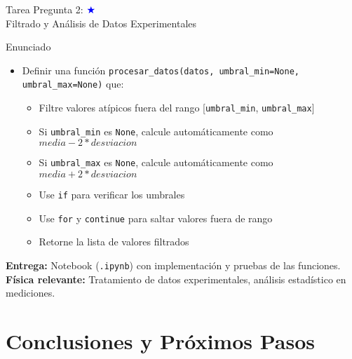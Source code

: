\documentclass[10pt]{beamer}
\begin{document}
\begin{frame}{Tarea Pregunta 2: \hfill \textcolor{blue}{$\bigstar$} \\ Filtrado y Análisis de Datos Experimentales}
  \begin{block}{Enunciado}
    \begin{itemize}
      \item Definir una función \texttt{procesar\_datos(datos, umbral\_min=None, umbral\_max=None)} que:
        \begin{itemize}
          \item Filtre valores atípicos fuera del rango [\texttt{umbral\_min}, \texttt{umbral\_max}]
          \item Si \texttt{umbral\_min} es \texttt{None}, calcule automáticamente como $media - 2*desviacion$
          \item Si \texttt{umbral\_max} es \texttt{None}, calcule automáticamente como $media + 2*desviacion$
          \item Use \texttt{if} para verificar los umbrales
          \item Use \texttt{for} y \texttt{continue} para saltar valores fuera de rango
          \item Retorne la lista de valores filtrados
        \end{itemize}
    \end{itemize}
  \end{block}
  
  \textbf{Entrega:} Notebook (\texttt{.ipynb}) con implementación y pruebas de las funciones.\\
  \textbf{Física relevante:} Tratamiento de datos experimentales, análisis estadístico en mediciones.
\end{frame}



\section{Conclusiones y Próximos Pasos}
\end{document}

